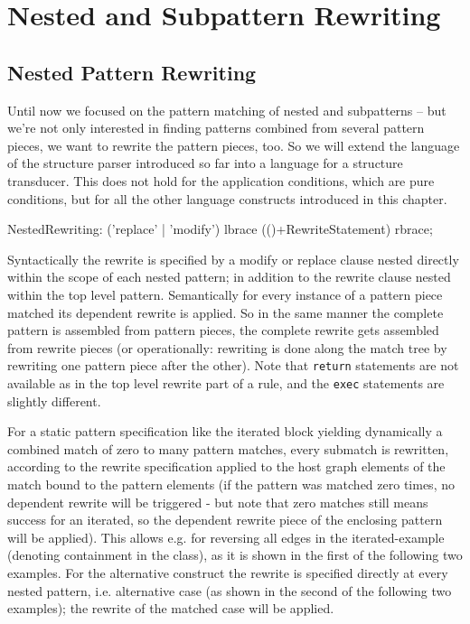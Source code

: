 \chapter{Nested and Subpattern Rewriting}


\section{Nested Pattern Rewriting}
\label{sec:nestedrewrite}

Until now we focused on the pattern matching of nested and subpatterns -- but we're not only interested in finding patterns combined from several pattern pieces, we want to rewrite the pattern pieces, too.
So we will extend the language of the structure parser introduced so far into a language for a structure transducer.
This does not hold for the application conditions, which are pure conditions, but for all the other language constructs introduced in this chapter.

\begin{rail}  
  NestedRewriting: ('replace' | 'modify') lbrace (()+RewriteStatement) rbrace;
\end{rail}

Syntactically the rewrite is specified by a modify or replace clause nested directly within the scope of each nested pattern;
in addition to the rewrite clause nested within the top level pattern.
Semantically for every instance of a pattern piece matched its dependent rewrite is applied. 
So in the same manner the complete pattern is assembled from pattern pieces, the complete rewrite gets assembled from rewrite pieces
(or operationally: rewriting is done along the match tree by rewriting one pattern piece after the other).
Note that \texttt{return} statements are not available as in the top level rewrite part of a rule, and the \texttt{exec} statements are slightly different.

For a static pattern specification like the iterated block yielding dynamically a combined match of zero to many pattern matches, every submatch is rewritten, according to the rewrite specification applied to the host graph elements of the match bound to the pattern elements
(if the pattern was matched zero times, no dependent rewrite will be triggered - but note that zero matches still means success for an iterated, so the dependent rewrite piece of the enclosing pattern will be applied).
This allows e.g. for reversing all edges in the iterated-example (denoting containment in the class), as it is shown in the first of the following two examples.
For the alternative construct the rewrite is specified directly at every nested pattern, i.e. alternative case (as shown in the second of the following two examples); the rewrite of the matched case will be applied.

